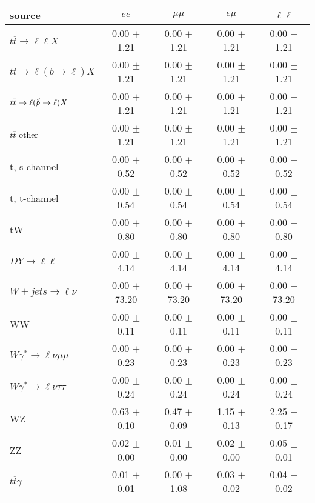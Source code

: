 \begin{tabular}{l|cccc} \hline\hline
source & $ee$ & $\mu\mu$ & $e\mu$ & $\ell\ell $ \\
\hline
$t\overline{t} \rightarrow \ell \ell X$ &  0.00 $\pm$  1.21 &  0.00 $\pm$  1.21 &  0.00 $\pm$  1.21 &  0.00 $\pm$  1.21 \\
$t\overline{t} \rightarrow \ell (b \rightarrow \ell) X$ &  0.00 $\pm$  1.21 &  0.00 $\pm$  1.21 &  0.00 $\pm$  1.21 &  0.00 $\pm$  1.21 \\
$t\overline{t} \rightarrow \ell (\slashed b \rightarrow \ell) X$ &  0.00 $\pm$  1.21 &  0.00 $\pm$  1.21 &  0.00 $\pm$  1.21 &  0.00 $\pm$  1.21 \\
        $t\overline{t}\ \rm{other}$ &  0.00 $\pm$  1.21 &  0.00 $\pm$  1.21 &  0.00 $\pm$  1.21 &  0.00 $\pm$  1.21 \\
\hline
                       t, s-channel &  0.00 $\pm$  0.52 &  0.00 $\pm$  0.52 &  0.00 $\pm$  0.52 &  0.00 $\pm$  0.52 \\
                       t, t-channel &  0.00 $\pm$  0.54 &  0.00 $\pm$  0.54 &  0.00 $\pm$  0.54 &  0.00 $\pm$  0.54 \\
                                 tW &  0.00 $\pm$  0.80 &  0.00 $\pm$  0.80 &  0.00 $\pm$  0.80 &  0.00 $\pm$  0.80 \\
\hline
         $DY \rightarrow \ell \ell$ &  0.00 $\pm$  4.14 &  0.00 $\pm$  4.14 &  0.00 $\pm$  4.14 &  0.00 $\pm$  4.14 \\
      $W+jets \rightarrow \ell \nu$ &  0.00 $\pm$ 73.20 &  0.00 $\pm$ 73.20 &  0.00 $\pm$ 73.20 &  0.00 $\pm$ 73.20 \\
                                 WW &  0.00 $\pm$  0.11 &  0.00 $\pm$  0.11 &  0.00 $\pm$  0.11 &  0.00 $\pm$  0.11 \\
\hline
$W\gamma^{*} \rightarrow \ell \nu \mu\mu$ &  0.00 $\pm$  0.23 &  0.00 $\pm$  0.23 &  0.00 $\pm$  0.23 &  0.00 $\pm$  0.23 \\
$W\gamma^{*} \rightarrow \ell \nu \tau\tau$ &  0.00 $\pm$  0.24 &  0.00 $\pm$  0.24 &  0.00 $\pm$  0.24 &  0.00 $\pm$  0.24 \\
                                 WZ &  0.63 $\pm$  0.10 &  0.47 $\pm$  0.09 &  1.15 $\pm$  0.13 &  2.25 $\pm$  0.17 \\
                                 ZZ &  0.02 $\pm$  0.00 &  0.01 $\pm$  0.00 &  0.02 $\pm$  0.00 &  0.05 $\pm$  0.01 \\
\hline
              $t\overline{t}\gamma$ &  0.01 $\pm$  0.01 &  0.00 $\pm$  1.08 &  0.03 $\pm$  0.02 &  0.04 $\pm$  0.02 \\

\end{tabular}
